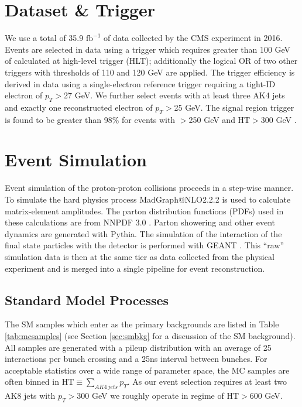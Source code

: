 \section{Dataset \& Trigger}

We use a total of 35.9 $\mathrm{fb}^{-1}$ of data collected by the CMS experiment in 2016. Events are selected in data using a trigger which requires greater than 100 GeV of \ptmiss calculated at high-level trigger (HLT); additionally the logical OR of two other triggers with thresholds of 110 and 120 GeV are applied. The trigger efficiency is derived in data using a single-electron reference trigger requiring a tight-ID electron of $p_{T}$$>$27 GeV. We further select events with at least three AK4 jets and exactly one reconstructed electron of $p_{T}$$>$25 GeV. The signal region trigger is found to be greater than 98\% for events with \ptmiss$>$250 GeV and HT$>$300 GeV \cite{CMS-SUS-16-033}.

\section{Event Simulation}

Event simulation of the proton-proton collisions proceeds in a step-wise manner.
To simulate the hard physics process MadGraph@NLO2.2.2 \cite{Alwall:2014hca} is used to calculate matrix-element amplitudes. The parton distribution functions (PDFs) used in these calculations are from NNPDF 3.0 \cite{Ball:2014uwa}.
Parton showering and other event dynamics are generated with Pythia.\cite{pythiacite}
The simulation of the interaction of the final state particles with the detector is performed with GEANT \cite{Agostinelli:2002hh}.
This ``raw'' simulation data is then at the same tier as data collected from the physical experiment and is merged into a single pipeline for event reconstruction.

\subsection{Standard Model Processes}
\label{sec:smp}

The SM samples which enter as the primary backgrounds are listed in Table \ref{tab:mcsamples} (see Section \ref{sec:smbkg} for a discussion of the SM background). All samples are generated with a pileup distribution with an average of 25 interactions per bunch crossing and a 25ns interval between bunches. For acceptable statistics over a wide range of parameter space, the MC samples are often binned in $\mathrm{HT}\equiv\sum_{AK4\,jets}p_{T}$. As our event selection requires at least two AK8 jets with $p_{T}$$>$300 GeV we roughly operate in regime of HT$>$600 GeV.

